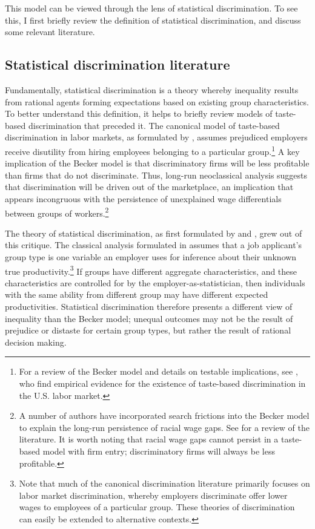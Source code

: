 This model can be viewed through the lens of statistical discrimination.
To see this, I first briefly review the definition of statistical discrimination, and discuss some relevant literature.

\subsection{Statistical discrimination literature}

Fundamentally, statistical discrimination is a theory whereby inequality results from rational agents forming expectations based on existing group characteristics.
To better understand this definition, it helps to briefly review models of taste-based discrimination that preceded it.
The canonical model of taste-based discrimination in labor markets, as formulated by \textcite{B57}, assumes prejudiced employers receive disutility from hiring employees belonging to a particular group.\footnote{
    For a review of the Becker model and details on testable implications, see \textcite{CG08}, who find empirical evidence for the existence of taste-based discrimination in the U.S. labor market.
} 
A key implication of the Becker model is that discriminatory firms will be less profitable than firms that do not discriminate. 
Thus, long-run neoclassical analysis suggests that discrimination will be driven out of the marketplace, an implication that appears incongruous with the persistence of unexplained wage differentials between groups of workers.\footnote{
    A number of authors have incorporated search frictions into the Becker model to explain the long-run persistence of racial wage gaps.
    See \textcite{LL12} for a review of the literature.
    It is worth noting that racial wage gaps cannot persist in a taste-based model with firm entry; discriminatory firms will always be less profitable. 
}


The theory of statistical discrimination, as first formulated by \textcite{A72} and \textcite{P72}, grew out of this critique.
The classical analysis formulated in \textcite{AC77} assumes that a job applicant's group type is one variable an employer uses for inference about their unknown true productivity.\footnote{
    Note that much of the canonical discrimination literature primarily focuses on labor market discrimination, whereby employers discriminate offer lower wages to employees of a particular group.
    These theories of discrimination can easily be extended to alternative contexts.
}
If groups have different aggregate characteristics, and these characteristics are controlled for by the employer-as-statistician, then individuals with the same ability from different group may have different expected productivities.
Statistical discrimination therefore presents a different view of inequality than the Becker model; unequal outcomes may not be the result of prejudice or distaste for certain group types, but rather the result of rational decision making.

